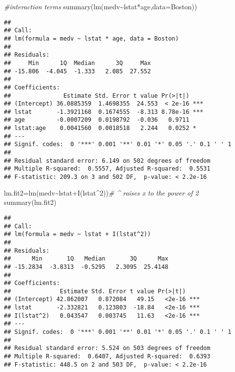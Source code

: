 \documentclass[
]{article}
\newenvironment{Shaded}{\begin{snugshade}}{\end{snugshade}}
\newcommand{\AttributeTok}[1]{\textcolor[rgb]{0.77,0.63,0.00}{#1}}
\newcommand{\CommentTok}[1]{\textcolor[rgb]{0.56,0.35,0.01}{\textit{#1}}}
\newcommand{\DecValTok}[1]{\textcolor[rgb]{0.00,0.00,0.81}{#1}}
\newcommand{\FunctionTok}[1]{\textcolor[rgb]{0.00,0.00,0.00}{#1}}
\newcommand{\NormalTok}[1]{#1}
\newcommand{\OtherTok}[1]{\textcolor[rgb]{0.56,0.35,0.01}{#1}}
\newcommand{\SpecialCharTok}[1]{\textcolor[rgb]{0.00,0.00,0.00}{#1}}
\begin{document}
\begin{Shaded}
\begin{Highlighting}[]
\CommentTok{\#interaction terms}
\FunctionTok{summary}\NormalTok{(}\FunctionTok{lm}\NormalTok{(medv}\SpecialCharTok{\textasciitilde{}}\NormalTok{lstat}\SpecialCharTok{*}\NormalTok{age,}\AttributeTok{data=}\NormalTok{Boston))}
\end{Highlighting}
\end{Shaded}

\begin{verbatim}
## 
## Call:
## lm(formula = medv ~ lstat * age, data = Boston)
## 
## Residuals:
##     Min      1Q  Median      3Q     Max 
## -15.806  -4.045  -1.333   2.085  27.552 
## 
## Coefficients:
##               Estimate Std. Error t value Pr(>|t|)    
## (Intercept) 36.0885359  1.4698355  24.553  < 2e-16 ***
## lstat       -1.3921168  0.1674555  -8.313 8.78e-16 ***
## age         -0.0007209  0.0198792  -0.036   0.9711    
## lstat:age    0.0041560  0.0018518   2.244   0.0252 *  
## ---
## Signif. codes:  0 '***' 0.001 '**' 0.01 '*' 0.05 '.' 0.1 ' ' 1
## 
## Residual standard error: 6.149 on 502 degrees of freedom
## Multiple R-squared:  0.5557, Adjusted R-squared:  0.5531 
## F-statistic: 209.3 on 3 and 502 DF,  p-value: < 2.2e-16
\end{verbatim}

\begin{Shaded}
\begin{Highlighting}[]
\NormalTok{lm.fit2}\OtherTok{=}\FunctionTok{lm}\NormalTok{(medv}\SpecialCharTok{\textasciitilde{}}\NormalTok{lstat}\SpecialCharTok{+}\FunctionTok{I}\NormalTok{(lstat}\SpecialCharTok{\^{}}\DecValTok{2}\NormalTok{))}\CommentTok{\# \^{} raises x to the power of 2}
\FunctionTok{summary}\NormalTok{(lm.fit2) }
\end{Highlighting}
\end{Shaded}

\begin{verbatim}
## 
## Call:
## lm(formula = medv ~ lstat + I(lstat^2))
## 
## Residuals:
##      Min       1Q   Median       3Q      Max 
## -15.2834  -3.8313  -0.5295   2.3095  25.4148 
## 
## Coefficients:
##              Estimate Std. Error t value Pr(>|t|)    
## (Intercept) 42.862007   0.872084   49.15   <2e-16 ***
## lstat       -2.332821   0.123803  -18.84   <2e-16 ***
## I(lstat^2)   0.043547   0.003745   11.63   <2e-16 ***
## ---
## Signif. codes:  0 '***' 0.001 '**' 0.01 '*' 0.05 '.' 0.1 ' ' 1
## 
## Residual standard error: 5.524 on 503 degrees of freedom
## Multiple R-squared:  0.6407, Adjusted R-squared:  0.6393 
## F-statistic: 448.5 on 2 and 503 DF,  p-value: < 2.2e-16
\end{verbatim}
\end{document}
